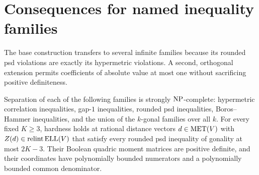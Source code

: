 \section{Consequences for named inequality families}
\label{sec:classes}

The base construction transfers to several infinite families because its
rounded psd violations are exactly its hypermetric violations. A second,
orthogonal extension permits coefficients of absolute value at most one
without sacrificing positive definiteness.

\begin{theorem}\label{thm:binary-families}
Separation of each of the following families is strongly $\mathrm{NP}$-complete:
hypermetric correlation inequalities, gap-$1$ inequalities, rounded psd
inequalities, Boros--Hammer inequalities, and the union of the $k$-gonal
families over all $k$.
For every fixed $K\geq3$, hardness holds at rational distance vectors
$d\in\operatorname{MET}(V)$ with $Z(d)\in\operatorname{relint}\operatorname{ELL}(V)$ that satisfy
every rounded psd inequality of gonality at most $2K-3$.
Their Boolean quadric moment matrices are positive definite, and their
coordinates have polynomially bounded numerators and a polynomially
bounded common denominator.
\end{theorem}

